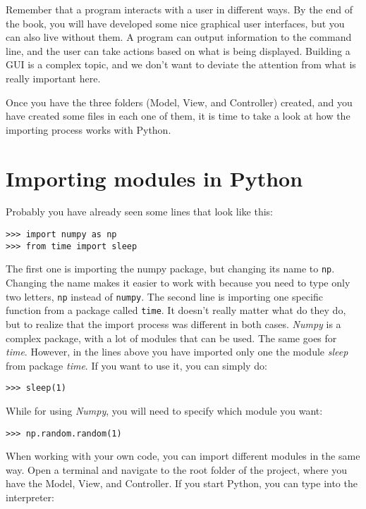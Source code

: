 Remember that a program interacts with a user in different ways. By the
end of the book, you will have developed some nice graphical user
interfaces, but you can also live without them. A program can output
information to the command line, and the user can take actions based on
what is being displayed. Building a {GUI} is a complex topic, and we
don't want to deviate the attention from what is really important here.

Once you have the three folders (Model, View, and Controller) created,
and you have created some files in each one of them, it is time to take
a look at how the importing process works with Python.

\section{Importing modules in Python}
Probably you have already seen some lines that look like this:

\begin{verbatim}
>>> import numpy as np
>>> from time import sleep
\end{verbatim}

The first one is importing the numpy package, but changing its name to
\texttt{np}. Changing the name makes it easier to work with because you
need to type only two letters, \texttt{np} instead of \texttt{numpy}.
The second line is importing one specific function from a package called
\texttt{time}. It doesn't really matter what do they do, but to realize
that the import process was different in both cases. \emph{Numpy} is a
complex package, with a lot of modules that can be used. The same goes
for \emph{time}. However, in the lines above you have imported only one
the module \emph{sleep} from package \emph{time}. If you want to use it,
you can simply do:

\begin{verbatim}
>>> sleep(1)
\end{verbatim}

While for using \emph{Numpy}, you will need to specify which module
you want:

\begin{verbatim}
>>> np.random.random(1)
\end{verbatim}

When working with your own code, you can import different modules in the
same way. Open a terminal and navigate to the root folder of the project, where you have the Model, View, and Controller. If you start
Python, you can type into the interpreter:

